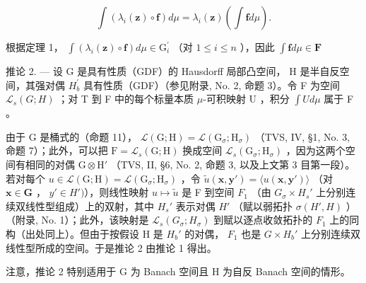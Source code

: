 \[
\int \left(\lambda_ {i} (\mathbf {z}) \circ \mathbf {f}\right) d \mu = \lambda_ {i} (\mathbf {z}) \left(\int \mathbf {f} d \mu\right).
\]

根据定理 1， \(\int (\lambda_i(\mathbf{z})\circ \mathbf{f})d\mu \in \mathrm{G}_i^\prime\) （对 \(1\leqslant i\leqslant n\) ），因此 \(\int \mathbf{f}d\mu \in \mathbf{F}\)

推论 2. --- 设 G 是具有性质（GDF）的 Hausdorff 局部凸空间， H 是半自反空间，其强对偶 \(H_{b}^{\prime}\) 具有性质（GDF）（参见附录, No. 2, 命题 3）。令 F 为空间 \(\mathcal{L}_{s}(G;H)\) ；对 T 到 F 中的每个标量本质 \(\mu\)-可积映射 U ，积分 \(\int U d\mu\) 属于 F 。

由于 G 是桶式的（命题 11）， \(\mathcal{L}(\mathrm{G};\mathrm{H}) = \mathcal{L}(\mathrm{G}_{\sigma};\mathrm{H}_{\sigma})\) （TVS, IV, §1, No. 3, 命题 7）；此外，可以把 \(\mathrm{F} = \mathcal{L}_s(\mathrm{G};\mathrm{H})\) 换成空间 \(\mathcal{L}_s(\mathrm{G}_{\sigma};\mathrm{H}_{\sigma})\) ，因为这两个空间有相同的对偶 \(\mathrm{G} \otimes \mathrm{H}'\) （TVS, II, §6, No. 2, 命题 3, 以及上文第 3 目第一段）。若对每个 \(u \in \mathcal{L}(\mathrm{G};\mathrm{H}) = \mathcal{L}(\mathrm{G}_{\sigma};\mathrm{H}_{\sigma})\) ，令 \(\widetilde{u}(\mathbf{x},\mathbf{y}') = \langle u(\mathbf{x},\mathbf{y}') \rangle\) （对 \(\mathbf{x} \in \mathbf{G}\) ， \(y' \in H')\)），则线性映射 \(u \mapsto \widetilde{u}\) 是 F 到空间 \(F_1\) （由 \(G_\sigma \times H_s'\) 上分别连续双线性型组成）上的双射，其中 \(H_s'\) 表示对偶 \(H'\) （赋以弱拓扑 \(\sigma(H', H)\) ）（附录, No. 1）；此外，该映射是 \(\mathcal{L}_s(G_\sigma; H_\sigma)\) 到赋以逐点收敛拓扑的 \(F_1\) 上的同构（出处同上）。但由于按假设 H 是 \(H_b'\) 的对偶， \(F_1\) 也是 \(G \times H_b'\) 上分别连续双线性型所成的空间。于是推论 2 由推论 1 得出。

注意，推论 2 特别适用于 G 为 Banach 空间且 H 为自反 Banach 空间的情形。

